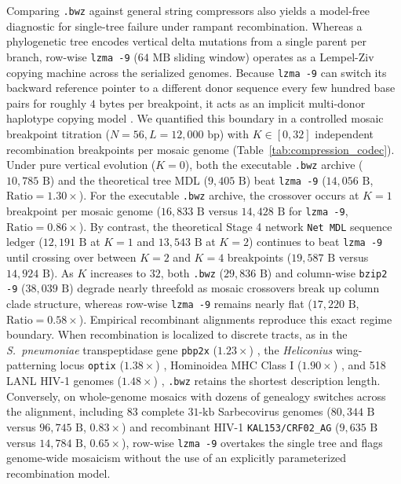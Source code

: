 \documentclass[11pt,a4paper]{article}
\begin{document}
Comparing \texttt{.bwz} against general string compressors also yields a model-free diagnostic for single-tree failure under rampant recombination. Whereas a phylogenetic tree encodes vertical delta mutations from a single parent per branch, row-wise \texttt{lzma -9} ($64\text{ MB}$ sliding window) operates as a Lempel-Ziv copying machine across the serialized genomes. Because \texttt{lzma -9} can switch its backward reference pointer to a different donor sequence every few hundred base pairs for roughly $4\text{ bytes}$ per breakpoint, it acts as an implicit multi-donor haplotype copying model \citep{li2003modeling}. We quantified this boundary in a controlled mosaic breakpoint titration ($N = 56, L = 12,000\text{ bp}$) with $K \in [0, 32]$ independent recombination breakpoints per mosaic genome (Table~\ref{tab:compression_codec}). Under pure vertical evolution ($K = 0$), both the executable \texttt{.bwz} archive ($10,785\text{ B}$) and the theoretical tree MDL ($9,405\text{ B}$) beat \texttt{lzma -9} ($14,056\text{ B}$, $\text{Ratio} = 1.30\times$). For the executable \texttt{.bwz} archive, the crossover occurs at $K = 1$ breakpoint per mosaic genome ($16,833\text{ B}$ versus $14,428\text{ B}$ for \texttt{lzma -9}, $\text{Ratio} = 0.86\times$). By contrast, the theoretical Stage 4 network \texttt{Net MDL} sequence ledger ($12,191\text{ B}$ at $K = 1$ and $13,543\text{ B}$ at $K = 2$) continues to beat \texttt{lzma -9} until crossing over between $K = 2$ and $K = 4$ breakpoints ($19,587\text{ B}$ versus $14,924\text{ B}$). As $K$ increases to $32$, both \texttt{.bwz} ($29,836\text{ B}$) and column-wise \texttt{bzip2 -9} ($38,039\text{ B}$) degrade nearly threefold as mosaic crossovers break up column clade structure, whereas row-wise \texttt{lzma -9} remains nearly flat ($17,220\text{ B}$, $\text{Ratio} = 0.58\times$). Empirical recombinant alignments reproduce this exact regime boundary. When recombination is localized to discrete tracts, as in the \textit{S.\ pneumoniae} transpeptidase gene \texttt{pbp2x} ($1.23\times$) \citep{dowson1989horizontal,croucher2011rapid}, the \textit{Heliconius} wing-patterning locus \texttt{optix} ($1.38\times$) \citep{pardodiaz2012adaptive,dasmahapatra2012butterfly}, Hominoidea MHC Class I ($1.90\times$) \citep{parham1996population}, and 518 LANL HIV-1 genomes ($1.48\times$) \citep{robertson2000hiv1}, \texttt{.bwz} retains the shortest description length. Conversely, on whole-genome mosaics with dozens of genealogy switches across the alignment, including 83 complete $31\text{-kb}$ Sarbecovirus genomes \citep{boni2020evolutionary,lytras2022exploring} ($80,344\text{ B}$ versus $96,745\text{ B}$, $0.83\times$) and recombinant HIV-1 \texttt{KAL153/CRF02\_AG} \citep{carr1998full} ($9,635\text{ B}$ versus $14,784\text{ B}$, $0.65\times$), row-wise \texttt{lzma -9} overtakes the single tree and flags genome-wide mosaicism without the use of an explicitly parameterized recombination model.
\end{document}
